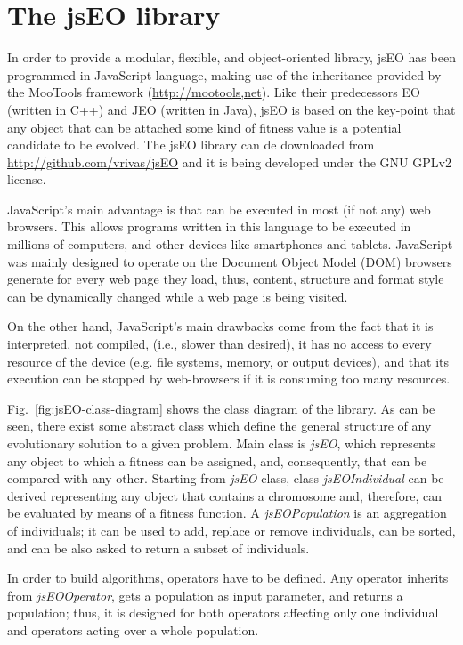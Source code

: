 \documentclass[runningheads,a4paper]{llncs}
\begin{document}
\section{The jsEO library}
\label{sec:jseo}
In order to provide a modular, flexible, and object-oriented library, jsEO has been programmed in JavaScript language, making use of the inheritance provided by the MooTools framework (\url{http://mootools,net}). Like their predecessors EO (written in C++) and JEO (written in Java), jsEO is based on the key-point that any object that can be attached some kind of fitness value is a potential candidate to be evolved. The jsEO library can de downloaded from \url{http://github.com/vrivas/jsEO} and it is being developed under the GNU GPLv2 license.

JavaScript's main advantage is that can be executed in most (if not any) web browsers. This allows programs written in this language to be executed in millions of computers, and other devices like smartphones and tablets. JavaScript was mainly designed to operate on the Document Object Model (DOM) browsers generate for every web page they load, thus, content, structure and format style can be dynamically changed while a web page is being visited.

On the other hand, JavaScript's main drawbacks come from the fact that it is interpreted, not compiled, (i.e., slower than desired), it has no access to every resource of the device (e.g. file systems,  memory, or output devices), and that its execution can be stopped by web-browsers if it is consuming too many resources.

Fig.~\ref{fig:jsEO-class-diagram} shows the class diagram of the library. As can be seen, there exist some abstract class which define the general structure of any evolutionary solution to a given problem. Main class is \textit{jsEO}, which represents any object to which a fitness can be assigned, and, consequently, that can be compared with any other. Starting from \textit{jsEO} class, class \textit{jsEOIndividual} can be derived representing any object that contains a chromosome and, therefore, can be evaluated by means of a fitness function. A \textit{jsEOPopulation} is an aggregation of individuals; it can be used to add, replace or remove individuals, can be sorted, and can be also asked to return a subset of individuals.

In order to build algorithms, operators have to be defined. Any operator inherits from \textit{jsEOOperator}, gets a population as input parameter, and returns a population; thus, it is designed for both operators affecting only one individual and operators acting over a whole population.
\end{document}
